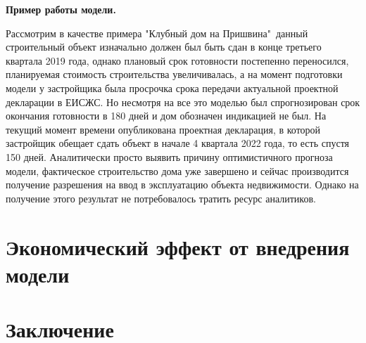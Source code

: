 \documentclass[12pt,a4paper]{article} %
\begin{document}
\textbf{Пример работы модели.}

Рассмотрим в качестве примера "Клубный дом на Пришвина"\ данный строительный объект изначально должен был быть сдан в конце третьего квартала 2019 года, однако плановый срок готовности постепенно переносился, планируемая стоимость строительства увеличивалась, а на момент подготовки модели у застройщика была просрочка срока передачи актуальной проектной декларации в ЕИСЖС. Но несмотря на все это моделью был спрогнозирован срок окончания готовности в 180 дней и дом обозначен индикацией не был. На текущий момент времени опубликована проектная декларация, в которой застройщик обещает сдать объект в начале 4 квартала 2022 года, то есть спустя 150 дней. Аналитически просто выявить причину оптимистичного прогноза модели, фактическое строительство дома уже завершено и сейчас производится получение разрешения на ввод в эксплуатацию объекта недвижимости. Однако на получение этого результат не потребовалось тратить ресурс аналитиков.


\newpage
\section{Экономический эффект от внедрения модели}



\newpage
\section{Заключение}





\newpage



\nocite{GV}
\end{document}
